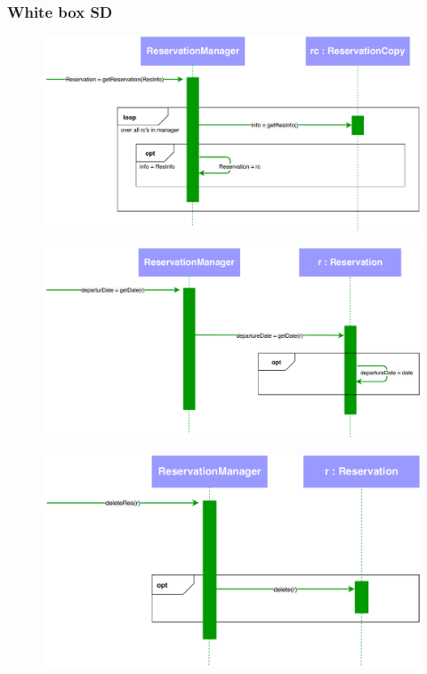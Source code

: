 \subsubsection{White box SD}
\creator{\studentB}
\updater{\studentC}
\begin{figure}[H]
    \centering
\includegraphics[scale=0.65]{Iteration_3/Files/UC3_wb1.pdf}
\end{figure}
\begin{figure}[H]
    \centering
\includegraphics[scale=0.65]{Iteration_3/Files/UC3_wb3.pdf}
\end{figure}
\begin{figure}[H]
    \centering
\includegraphics[scale=0.65]{Iteration_3/Files/UC3_wb2.pdf}
\end{figure}


